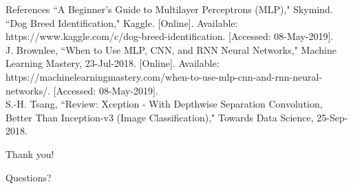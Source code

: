 \documentclass[leqno]{beamer}
\begin{document}
\begin{frame}{References}
    ``A Beginner's Guide to Multilayer Perceptrons (MLP)," Skymind.\\
    ``Dog Breed Identification," Kaggle. [Online]. Available: https://www.kaggle.com/c/dog-breed-identification. [Accessed: 08-May-2019].\\
    J. Brownlee, ``When to Use MLP, CNN, and RNN Neural Networks," Machine Learning Mastery, 23-Jul-2018. [Online]. Available: https://machinelearningmastery.com/when-to-use-mlp-cnn-and-rnn-neural-networks/. [Accessed: 08-May-2019].\\
    S.-H. Tsang, ``Review: Xception - With Depthwise Separation Convolution, Better Than Inception-v3 (Image Classification)," Towards Data Science, 25-Sep-2018.
\end{frame}

\begin{frame}{Thank you!}
    \begin{center}
        \Huge{Questions?}
    \end{center}
\end{frame}
\end{document}
